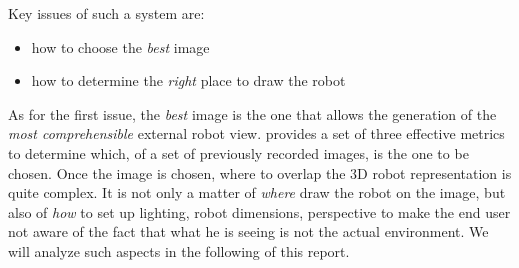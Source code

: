 %
Key issues of such a system are:
\begin{itemize}
\item how to choose the \textit{best} image
\item how to determine the \textit{right} place to draw the robot
\end{itemize}
%
As for the first issue, the \textit{best} image is the one that allows 
the generation of the \textit{most comprehensible} external robot view.
\cite{sugimoto} provides a set of three effective metrics to 
determine which, of a set of previously recorded images, is the 
one to be chosen.
%
Once the image is chosen, where to overlap the 3D robot representation 
is quite complex. It is not only a matter of \textit{where} draw the robot
on the image, but also of \textit{how} to set up lighting, robot dimensions,
perspective to make the end user not aware of the fact that what he is
seeing is not the actual environment.
%
We will analyze such aspects in the following of this report.

